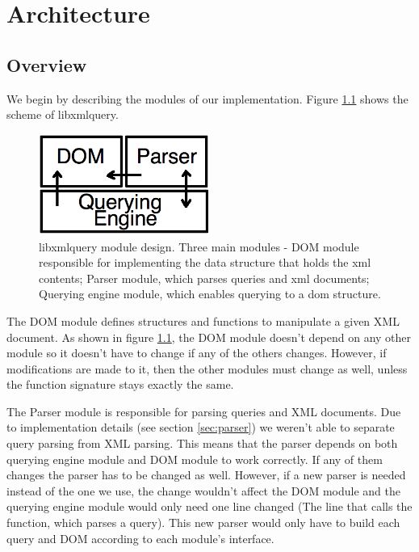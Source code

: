 \documentclass[a4paper]{report}
\begin{document}
\chapter{Architecture}\label{chap:arch}
\section{Overview}\label{sec:overview}
	We begin by describing the modules of our implementation. Figure \ref{fig:arch} shows the scheme of libxmlquery.

	 \begin{figure}[h!]
		\centering
		\label{fig:arch}
		\includegraphics[width=0.5\textwidth] {arch}
		\caption{libxmlquery module design. Three main modules - DOM module responsible for implementing the data structure that holds the xml contents; Parser module, which parses queries and xml documents;
		Querying engine module, which enables querying to a dom structure.}
	 \end{figure}

	The DOM module defines structures and functions to manipulate a given XML document. As shown in figure \ref{fig:arch}, the DOM module doesn't depend on any other module so it doesn't have to change if any of the others changes. However, if modifications are made to it, then the other modules must change as well, unless the function signature stays exactly the same.

	The Parser module is responsible for parsing queries and XML documents. Due to implementation details (see section \ref{sec:parser}) we weren't able to separate query parsing from XML parsing. This means that the parser depends on both querying engine module and DOM module to work correctly. If any of them changes the parser has to be changed as well. However, if a new parser is needed instead of the one we use, the change wouldn't affect the DOM module and the querying engine module would only need one line changed (The line that calls the function, which parses a query). This new parser would only have to build each query	and DOM according to each module's interface.
\end{document}
